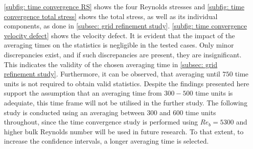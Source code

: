 \autoref{subfig: time convergence RS} shows the four Reynolds stresses and \autoref{subfig: time convergence total stress} shows the total stress, as well as its individual components, as done in \autoref{subsec: grid refinement study}.
\autoref{subfig: time convergence velocity defect} shows the velocity defect.
It is evident that the impact of the averaging times on the statistics is negligible in the tested cases.
Only minor discrepancies exist, and if such discrepancies are present, they are insignificant.
This indicates the validity of the chosen averaging time in \autoref{subsec: grid refinement study}.
Furthermore, it can be observed, that averaging until $750$ time units is not required to obtain valid statistics.
Despite the findings presented here support the assumption that an averaging time from $300-500$ time units is adequiate, this time frame will not be utilised in the further study.
The following study is conducted using an averaging between $300$ and $600$ time units throughout, since the time convergence study is performed using $Re_b = 5300$ and higher bulk Reynolds number will be used in future research.
To that extent, to increase the confidence intervals, a longer averaging time is selected.
